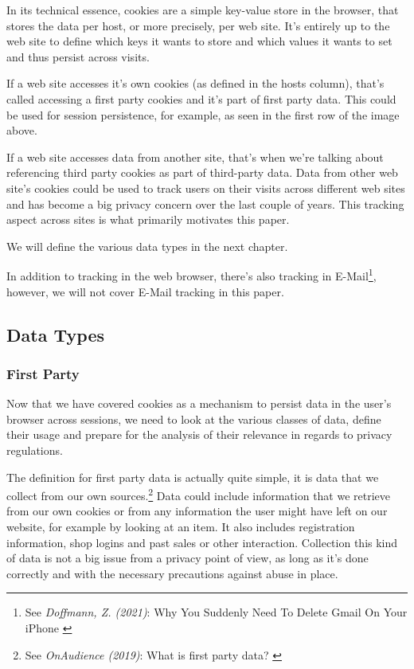 In its technical essence, cookies are a simple key-value store in the browser, that stores the data per host, or more precisely, per web site. It's entirely up to the web site to define which keys it wants to store and which values it wants to set and thus persist across visits. 

If a web site accesses it's own cookies (as defined in the hosts column), that's called accessing a first party cookies and it's part of first party data. This could be used for session persistence, for example, as seen in the first row of the image above. 

If a web site accesses data from another site, that's when we're talking about referencing third party cookies as part of third-party data. Data from other web site's cookies could be used to track users on their visits across different web sites and has become a big privacy concern over the last couple of years. This tracking aspect across sites is what primarily motivates this paper.

We will define the various data types in the next chapter.

In addition to tracking in the web browser, there's also tracking in E-Mail\footnote{See \textit{Doffmann, Z. (2021)}: Why You Suddenly Need To Delete Gmail On Your iPhone \cite{deleteGmail}}, however, we will not cover E-Mail tracking in this paper.

\subsection{Data Types}

\subsubsection{First Party}

Now that we have covered cookies as a mechanism to persist data in the user's browser across sessions, we need to look at the various classes of data, define their usage and prepare for the analysis of their relevance in regards to privacy regulations.

The definition for first party data is actually quite simple, it is data that we collect from our own sources.\footnote{See \textit{OnAudience (2019)}: What is first party data? \cite{firstParty}} Data could include information that we retrieve from our own cookies or from any information the user might have left on our website, for example by looking at an item. It also includes registration information, shop logins and past sales or other interaction. Collection this kind of data is not a big issue from a privacy point of view, as long as it's done correctly and with the necessary precautions against abuse in place.

